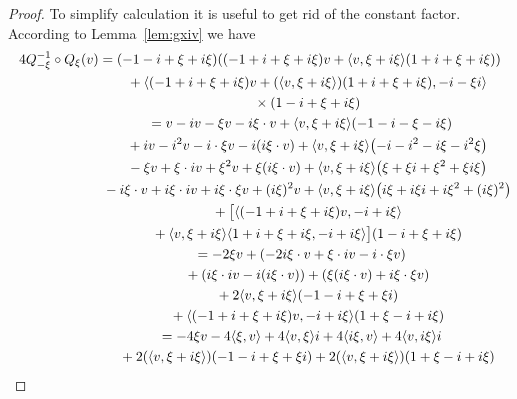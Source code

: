 \documentclass[pdftex]{sigma}
\numberwithin{equation}{section}
\begin{document}
\begin{proof}
 To simplify calculation it is useful to get rid of the constant factor. According to Lemma~\ref{lem:gxiv} we have
 \begin{gather*}
 4 Q_{-\xi}^{-1}\circ Q_\xi(v) = (-1-i+\xi+i\xi) ((-1+i+\xi+i\xi) v + \langle v, \xi + i\xi \rangle (1+i+\xi+i\xi) ) \\
\hphantom{4 Q_{-\xi}^{-1}\circ Q_\xi(v) =}{} + \langle (-1+i+\xi+i\xi) v + (\langle v, \xi + i\xi \rangle )(1+i+\xi+i\xi), -i - \xi i \rangle \\
\hphantom{4 Q_{-\xi}^{-1}\circ Q_\xi(v) =}{} \times (1-i+\xi+i\xi)\\
\hphantom{4 Q_{-\xi}^{-1}\circ Q_\xi(v)}{} = v-iv-\xi v-i\xi\cdot v+ \langle v, \xi + i\xi \rangle(-1-i-\xi-i\xi)\\
\hphantom{4 Q_{-\xi}^{-1}\circ Q_\xi(v) =}{} +iv-i^2v-i\cdot \xi v-i(i\xi\cdot v)+\langle v, \xi + i\xi \rangle\big({-}i-i^2-i\xi -i^2\xi\big)\\
\hphantom{4 Q_{-\xi}^{-1}\circ Q_\xi(v) =}{} -\xi v+\xi \cdot iv+\xi^2v+\xi (i\xi \cdot v)+\langle v, \xi + i\xi \rangle \big(\xi +\xi i+\xi^2+\xi i\xi\big)\\
\hphantom{4 Q_{-\xi}^{-1}\circ Q_\xi(v) =}{} -i\xi\cdot v+i\xi\cdot iv+i\xi\cdot \xi v+(i\xi)^2 v+ \langle v, \xi + i\xi \rangle \big(i\xi+i\xi i+i\xi^2+(i\xi)^2\big)\\
\hphantom{4 Q_{-\xi}^{-1}\circ Q_\xi(v) =}{} +\big[ \langle (-1+i+\xi+i\xi)v, -i+i\xi \rangle \\
 \hphantom{4 Q_{-\xi}^{-1}\circ Q_\xi(v) =}{} + \langle v, \xi + i\xi \rangle \langle 1+i+\xi+i\xi ,-i+i\xi\rangle \big] (1-i+\xi+i\xi)\\
\hphantom{4 Q_{-\xi}^{-1}\circ Q_\xi(v)}{} = -2\xi v+(-2 i\xi\cdot v+\xi\cdot iv-i\cdot \xi v) \\
\hphantom{4 Q_{-\xi}^{-1}\circ Q_\xi(v) =}{} +(i\xi \cdot iv-i(i\xi \cdot v))+(\xi (i\xi \cdot v)+i\xi\cdot \xi v)\\
\hphantom{4 Q_{-\xi}^{-1}\circ Q_\xi(v) =}{} +2\langle v, \xi + i\xi \rangle(-1-i+\xi+\xi i) \\
\hphantom{4 Q_{-\xi}^{-1}\circ Q_\xi(v) =}{} +\langle (-1+i+\xi+i\xi)v, -i+i\xi \rangle(1+\xi-i+i\xi)\\
\hphantom{4 Q_{-\xi}^{-1}\circ Q_\xi(v)}{} =-4\xi v-4\langle \xi,v\rangle+4\langle v, \xi \rangle i+4\langle i\xi,v \rangle+4 \langle v, i\xi \rangle i\\
\hphantom{4 Q_{-\xi}^{-1}\circ Q_\xi(v) =}{} +2(\langle v, \xi + i\xi \rangle)(-1-i+\xi+\xi i)+2(\langle v, \xi + i\xi \rangle)(1+\xi-i+i\xi )\\

\end{gather*}
\end{proof}
\end{document}
